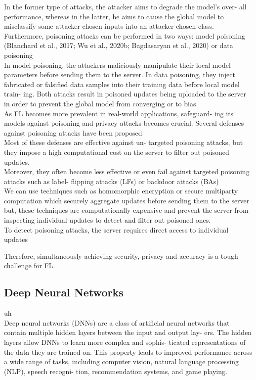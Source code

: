 In the former type of attacks, the attacker aims to degrade the model’s over- all 
 performance, whereas in the latter, he aims to cause the global model to misclassify 
 some attacker-chosen inputs into an attacker-chosen class.\\

Furthermore, poisoning attacks can be performed in two ways: model poisoning 
 (Blanchard et al., 2017; Wu et al., 2020b; Bagdasaryan et al., 2020) or data poisoning\\

 In model poisoning, the attackers maliciously manipulate their local model parameters 
 before sending them to the server. In data poisoning, they inject fabricated or falsified 
 data samples into their training data before local model train- ing. Both attacks result 
 in poisoned updates being uploaded to the server in order to prevent the global model from 
 converging or to bias\\

 As FL becomes more prevalent in real-world applications, safeguard- ing its models against poisoning and privacy attacks becomes crucial.
 Several defenses against poisoning attacks have been proposed\\

 Most of these defenses are effective against un- targeted poisoning attacks, but they impose a high computational cost on the server to filter out poisoned updates.\\

 Moreover, they often become less effective or even fail against targeted poisoning attacks such as label- flipping attacks (LFs) or backdoor attacks (BAs)\\

We can use techniques such as homomorphic encryption or secure multiparty computation
which securely aggregate updates before sending them to the server but, 
these techniques are computationally expensive and prevent the server from inspecting
 individual updates to detect and filter out poisoned ones.\\

To detect poisoning attacks, the server requires direct access to individual updates

Therefore, simultaneously achieving security, privacy and accuracy is a tough challenge for FL.\\

\subsection{Deep Neural Networks}
uh\\
Deep neural networks (DNNs) are a class of artificial neural networks that 
contain multiple hidden layers between the input and output lay- ers. The 
hidden layers allow DNNs to learn more complex and sophis- ticated 
representations of the data they are trained on. This property leads to 
improved performance across a wide range of tasks, including computer 
vision, natural language processing (NLP), speech recogni- tion, 
recommendation systems, and game playing.\\




